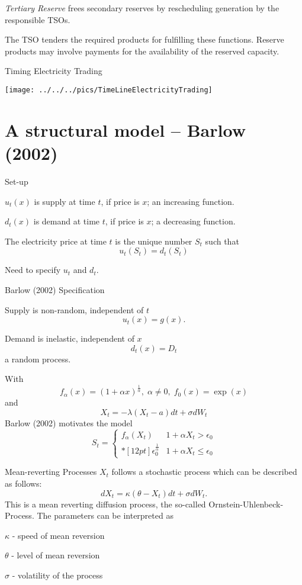	{\it Tertiary Reserve} frees secondary reserves by rescheduling generation by the responsible TSOs.


The TSO tenders the required products for fulfilling these functions. Reserve products may involve payments for the availability of the reserved capacity.

{Timing Electricity Trading}
\begin{center}
\texttt{[image: ../../../pics/TimeLineElectricityTrading]}
\end{center}

\section{A structural model -- Barlow (2002)}

{Set-up}


	$u_t(x)$ is supply at time $t$, if price is $x$; an increasing function.

	$d_t(x)$ is demand at time $t$, if price is $x$; a decreasing function.

	The electricity price at time $t$ is the unique number $S_t$ such that
$$
u_t(S_t)=d_t(S_t)
$$

	Need to specify $u_t$ and $d_t$.


{Barlow (2002) Specification}


	Supply is non-random, independent of $t$
$$u_t(x)=g(x).$$

	Demand is inelastic, independent of $x$
$$d_t(x)=D_t$$
a random process.

	With
$$
f_\alpha(x) = (1+\alpha x)^\frac{1}{\alpha}, \;\alpha \not=0, \; f_0(x)=\exp(x)
$$
and
$$
X_t= -\lambda (X_t-a)dt +\sigma dW_t
$$
Barlow (2002) motivates the model
$$
S_t= \left \{ \begin{array}{ll}
\displaystyle
f_\alpha(X_t) & 1+\alpha  X_t> \epsilon_0 \\*[12pt]
\epsilon_0^\frac{1}{\alpha} & 1+\alpha X_t \leq \epsilon_0
\end{array}
\right.
$$


{Mean-reverting Processes}
$X_t$ follows a stochastic process which can be described as follows:
$$
dX_t= \kappa \left( \theta -X_t \right) dt + \sigma dW_t.
$$
This is  a mean reverting diffusion process, the so-called Ornstein-Uhlenbeck-Process.
The parameters can be interpreted as


	$\kappa$ - speed of mean reversion

	$\theta$ - level of mean reversion

	$\sigma$ - volatility of the process

